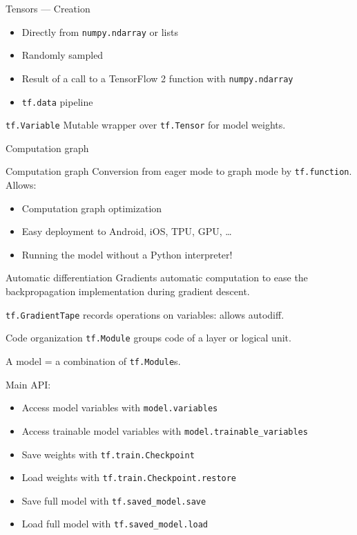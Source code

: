\begin{frame}{Tensors --- Creation}
  \begin{itemize}[<+->]
    \item Directly from \texttt{numpy.ndarray} or lists
    \item Randomly sampled
    \item Result of a call to a TensorFlow 2 function with \texttt{numpy.ndarray}
    \item \texttt{tf.data} pipeline
  \end{itemize}
\end{frame}

\begin{frame}{\texttt{tf.Variable}}
  Mutable wrapper over \texttt{tf.Tensor} for model weights.
\end{frame}

\begin{frame}{Computation graph}
\end{frame}

\begin{frame}{Computation graph}
  Conversion from eager mode to graph mode by \texttt{tf.function}. Allows:

  \begin{itemize}[<+->]
    \item Computation graph optimization
    \item Easy deployment to Android, iOS, TPU, GPU, …
    \item Running the model without a Python interpreter!
  \end{itemize}
\end{frame}

\begin{frame}{Automatic differentiation}
  Gradients automatic computation to ease the backpropagation implementation during gradient descent.

  \texttt{tf.GradientTape} records operations on variables: allows autodiff.
\end{frame}

\begin{frame}{Code organization}
  \texttt{tf.Module} groups code of a layer or logical unit.

  A model = a combination of \texttt{tf.Module}s.

  Main API:

  \begin{itemize}[<+->]
    \item Access model variables with \texttt{model.variables}
    \item Access trainable model variables with \texttt{model.trainable\_variables}
    \item Save weights with \texttt{tf.train.Checkpoint}
    \item Load weights with \texttt{tf.train.Checkpoint.restore}
    \item Save full model with \texttt{tf.saved\_model.save}
    \item Load full model with \texttt{tf.saved\_model.load}
  \end{itemize}
\end{frame}